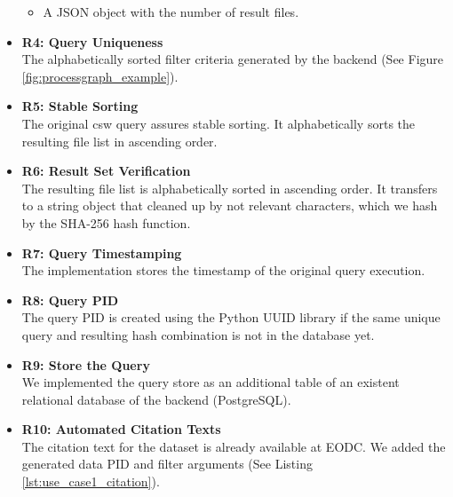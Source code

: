 \documentclass[draft,final]{vutinfth} %
\newcommand{\bgoesswein}[1]{{\color{blue}#1}}
\begin{document}
\begin{itemize}
\begin{itemize}
		\item A JSON object with the number of result files.
	\end{itemize}
	\item \textbf{R4: Query Uniqueness} \\
	The alphabetically sorted \bgoesswein{filter criteria} generated by the backend (See Figure \ref{fig:processgraph_example}).
	\item \textbf{R5: Stable Sorting} \\
	The original \acrshort{csw} query assures stable sorting. It alphabetically sorts the resulting file list in ascending order.
	\item \textbf{R6: Result Set Verification} \\
	The resulting file list is alphabetically sorted in ascending order. It transfers to a string object that cleaned up by not relevant characters, which we hash by the SHA-256 hash function. 
	\item \textbf{R7: Query Timestamping} \\
	The implementation stores the timestamp of the original query execution. 
	\item \textbf{R8: Query PID}\\
	The query PID is created using the Python UUID library if the same unique query and resulting hash combination is not in the database yet.
	\item \textbf{R9: Store the Query} \\
	We implemented the query store as an additional table of an existent relational database of the backend (PostgreSQL). 
	\item \textbf{R10: Automated Citation Texts} \\
	The citation text for the dataset is already available at EODC. We added the generated data PID and filter arguments \bgoesswein{(See Listing \ref{lst:use_case1_citation})}. %
	

\end{itemize}
\end{document}
